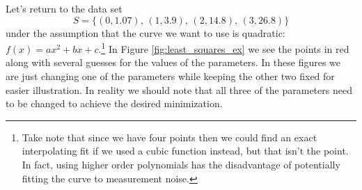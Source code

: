 Let's return to the data set 
\[ S = \{ (0,1.07), \, (1,3.9), \, (2,14.8), \, (3,26.8)\} \]
under the assumption that the curve we want to use is quadratic: $f(x) = ax^2 + bx +
c$.\footnote{Take note that since we have four points then we could find an exact
    interpolating fit if we used a cubic function instead, but that isn't the point.  In
    fact, using higher order polynomials has the disadvantage of potentially fitting the
curve to measurement noise.} In Figure \ref{fig:least_squares_ex} we see the points in red
along with several guesses for the values of the parameters.  In these figures we are just
changing one of the parameters while keeping the other two fixed for easier illustration.
In reality we should note that all three of the parameters need to be changed to achieve
the desired minimization.  

